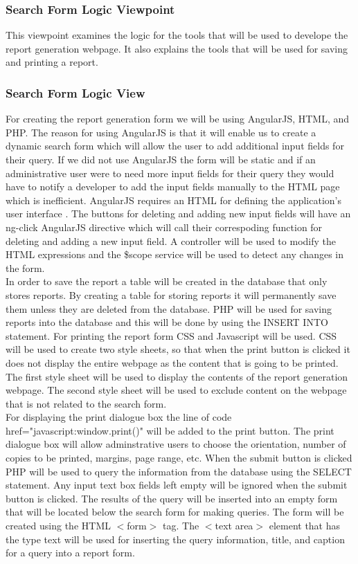 \documentclass[letterpaper,10pt,serif, draftclsnofoot,onecolumn, compsoc, titlepage]{IEEEtran}
\begin{document}
\subsubsection{Search Form Logic Viewpoint}
This viewpoint examines the logic for the tools that will be used to develope the report generation webpage. It also explains the tools that will be used for saving and printing a report.  

\subsubsection{Search Form Logic View} 
For creating the report generation form we will be using AngularJS, HTML, and PHP. The reason for using AngularJS is that it will enable us to create a dynamic search form which will allow the user to add additional input fields for their query. If we did not use AngularJS the form will be static and if an administrative user were to need more input fields for their query they would have to notify a developer to add the input fields manually to the HTML page which is inefficient. AngularJS requires an HTML for defining the application's user interface \cite{Lau}. The buttons for deleting and adding new input fields will have an ng-click AngularJS directive which will call their correspoding function for deleting and adding a new input field.  A controller will be used to modify the HTML expressions and the \$scope service will be used to detect any changes in the form\cite{Rav}.\\ 

In order to save the report a table will be created in the database that only stores reports. By creating a table for storing reports it will permanently save them unless they are deleted from the database. PHP will be used for saving reports into the database and this will be done by using the INSERT INTO statement. For printing the report form CSS and Javascript will be used. CSS will be used to create two style sheets, so that when the print button is clicked it does not display the entire webpage as the content that is going to be printed. The first style sheet will be used to display the contents of the report generation webpage. The second style sheet will be used to exclude content on the webpage that is not related to the search form.\\

For displaying the print dialogue box the line of code href="javascript:window.print()" will be added to the print button. The print dialogue box will allow adminstrative users to choose the orientation, number of copies to be printed, margins, page range, etc. When the submit button is clicked PHP will be used to query the information from the database using the SELECT statement. Any input text box fields left empty will be ignored when the submit button is clicked. The results of the query will be inserted into an empty form that will be located below the search form for making queries. The form will be created using the HTML $<$form$>$ tag. The $<$text area$>$ element that has the type text will be used for inserting the query information, title, and caption for a query into a report form. 
\end{document}

